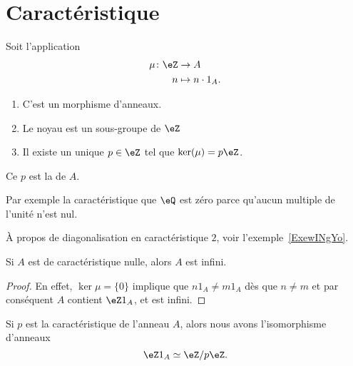 \section{Caractéristique}

\begin{lemmaDef}        \label{LEMDEFooVEWZooUrPaDw}
    Soit l'application
    \begin{equation}
        \begin{aligned}
            \mu\colon \eZ&\to A \\
            n&\mapsto n\cdot 1_A .
        \end{aligned}
    \end{equation}
    \begin{enumerate}
        \item
            C'est un morphisme d'anneaux.
        \item
            Le noyau est un sous-groupe de \( \eZ\)
        \item
            Il existe un unique \( p\in \eZ\) tel que \( \ker(\mu)=p\eZ\).
    \end{enumerate}
    Ce \( p\) est la  de \( A\).
\end{lemmaDef}

Par exemple la caractéristique que \( \eQ\) est zéro parce qu'aucun multiple de l'unité n'est nul.

À propos de diagonalisation en caractéristique \( 2\), voir l'exemple~\ref{ExewINgYo}.

\begin{lemma}
    Si \( A\) est de caractéristique nulle, alors \( A\) est infini.
\end{lemma}

\begin{proof}
    En effet, \( \ker\mu=\{0\} \) implique que \( n1_A \neq  m1_A\) dès que \(n \neq m \) et par conséquent \( A\) contient \(\eZ 1_A \), et  est infini.
\end{proof}

\begin{lemma}       \label{LemHmDaYH}
    Si \( p\) est la caractéristique de l'anneau \( A\), alors nous avons l'isomorphisme d'anneaux
    \begin{equation}
         \eZ 1_A\simeq\eZ/p\eZ.
    \end{equation}
\end{lemma}

